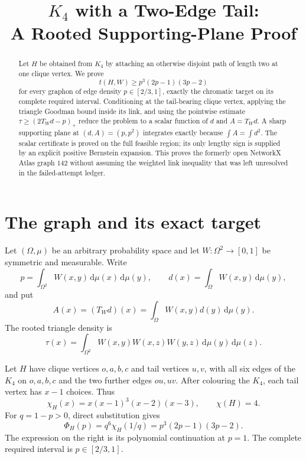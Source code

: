 \documentclass[11pt]{article}
\title{$K_4$ with a Two-Edge Tail:\\A Rooted Supporting-Plane Proof}
\author{}
\date{}
\newcommand{\dd}{\,\mathrm d}
\begin{document}
\maketitle

\begin{abstract}
Let $H$ be obtained from $K_4$ by attaching an otherwise disjoint path of
length two at one clique vertex.  We prove
\[
 t(H,W)\geq p^3(2p-1)(3p-2)
\]
for every graphon of edge density $p\in[2/3,1]$, exactly the chromatic
target on its complete required interval.  Conditioning at the tail-bearing
clique vertex, applying the triangle Goodman bound inside its link, and using
the pointwise estimate $\tau\geq(2T_Wd-p)_+$ reduce the problem to a scalar
function of $d$ and $A=T_Wd$.  A sharp supporting plane at
$(d,A)=(p,p^2)$ integrates exactly because
$\int A=\int d^2$.  The scalar certificate is proved on the full feasible
region; its only lengthy sign is supplied by an explicit positive Bernstein
expansion.  This proves the formerly open NetworkX Atlas graph $142$ without
assuming the weighted link inequality that was left unresolved in the
failed-attempt ledger.
\end{abstract}


\section{The graph and its exact target}

Let $(\Omega,\mu)$ be an arbitrary probability space and let
$W\colon\Omega^2\to[0,1]$ be symmetric and measurable.  Write
\[
 p=\int_{\Omega^2}W(x,y)\dd\mu(x)\dd\mu(y),
 \qquad
 d(x)=\int_\Omega W(x,y)\dd\mu(y),
\]
and put
\[
 A(x)=(T_Wd)(x)=\int_\Omega W(x,y)d(y)\dd\mu(y).
\]
The rooted triangle density is
\[
 \tau(x)=\int_{\Omega^2}
 W(x,y)W(x,z)W(y,z)\dd\mu(y)\dd\mu(z).
\]

Let $H$ have clique vertices $o,a,b,c$ and tail vertices $u,v$, with
all six edges of the $K_4$ on $o,a,b,c$ and the two further edges
$ou,uv$.  After colouring the $K_4$, each tail vertex has $x-1$ choices.
Thus
\begin{equation}
 \chi_H(x)=x(x-1)^3(x-2)(x-3),
 \qquad \chi(H)=4.
 \label{eq:chromatic}
\end{equation}
For $q=1-p>0$, direct substitution gives
\begin{equation}
 \Phi_H(p)=q^6\chi_H(1/q)
 =p^3(2p-1)(3p-2).
 \label{eq:target}
\end{equation}
The expression on the right is its polynomial continuation at $p=1$.
The complete required interval is $p\in[2/3,1]$.
\end{document}
